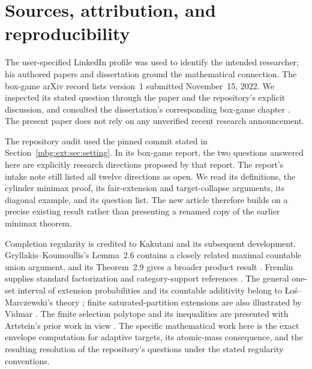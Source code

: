 \documentclass[11pt,letterpaper]{article}
\theoremstyle{definition}
\begin{document}
\section{Sources, attribution, and reproducibility}
\label{mbg:ext:app:sources}

The user-specified LinkedIn profile was used to identify the intended researcher; his authored papers and dissertation ground the mathematical connection. The box-game arXiv record lists version~1 submitted November~15, 2022. We inspected its stated question through the paper and the repository's explicit discussion, and consulted the dissertation's corresponding box-game chapter \cite{GlazerBox,ext:GlazerThesis}. The present paper does not rely on any unverified recent research announcement.

The repository audit used the pinned commit stated in Section~\ref{mbg:ext:sec:setting}. In its box-game report, the two questions answered here are explicitly research directions proposed by that report. The report's intake note still listed all twelve directions as open. We read its definitions, the cylinder minimax proof, its fair-extension and target-collapse arguments, its diagonal example, and its question list. The new article therefore builds on a precise existing result rather than presenting a renamed copy of the earlier minimax theorem.

Completion regularity is credited to Kakutani and its subsequent development. Gryllakis--Koumoullis's Lemma~2.6 contains a closely related maximal countable union argument, and its Theorem~2.9 gives a broader product result \cite{ext:GK}. Fremlin supplies standard factorization and category-support references \cite{ext:Fremlin25,ext:Fremlin4A}. The general one-set interval of extension probabilities and its countable additivity belong to \L o\'s--Marczewski's theory \cite[Theorems~1, 2, 4]{LosMarczewski}; finite saturated-partition extensions are also illustrated by Vidmar \cite[Lemma~7]{ext:Vidmar}. The finite selection polytope and its inequalities are presented with Artstein's prior work in view \cite{ext:Artstein}. The specific mathematical work here is the exact envelope computation for adaptive targets, its atomic-mass consequence, and the resulting resolution of the repository's questions under the stated regularity conventions.
\end{document}
